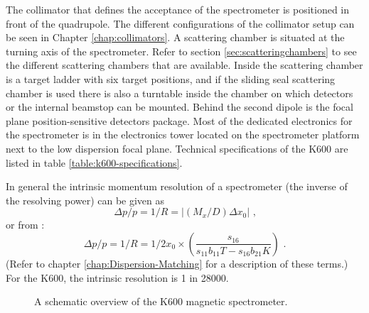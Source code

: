 \documentclass[11pt]{report}
\begin{document}
The collimator that defines the acceptance of the spectrometer is positioned in front of the quadrupole.
The different configurations of the collimator setup can be seen in Chapter \ref{chap:collimators}.
A scattering chamber is situated at the turning axis of the spectrometer. 
Refer to section \ref{sec:scatteringchambers} to see the different scattering chambers that are available.
Inside the scattering chamber is a target ladder with six target positions, 
and if the sliding seal scattering chamber is used there is also a
turntable inside the chamber on which detectors or the internal beamstop can be mounted. 
Behind the second dipole is the focal plane position-sensitive detectors package.
Most of the dedicated electronics for the spectrometer is in the electronics tower located 
on the spectrometer platform next to the low dispersion focal plane.
Technical specifications of the K600 are listed in 
table \ref{table:k600-specifications}.


%
%



In general the intrinsic momentum resolution of a spectrometer (the inverse of the resolving power) can be given as \cite{Wak02}
\begin{equation} 
\Delta p/p = 1/R = \left|  (M_{x}/D)\Delta x_{0}  \right|   \textrm{   ,}
\end{equation} 
%
or from \cite{Fuj02}: 
%
\begin{equation} 
\Delta p/p = 1/R = 1/2x_{0}\times(\frac{s_{16}}{s_{11}b_{11}T-s_{16}b_{21}K   }) \textrm{   .}
\end{equation} 
%
(Refer to chapter \ref{chap:Dispersion-Matching} for a description of these terms.)
For the K600, the intrinsic resolution is 1 in 28000.




\begin{figure}[!ht]
\centerline{\vspace{0cm}\hspace{0cm}
}
\centering
\caption{A schematic overview of the K600 magnetic spectrometer.}
\label{fig:k600-fig}
\end{figure} 
\end{document}
